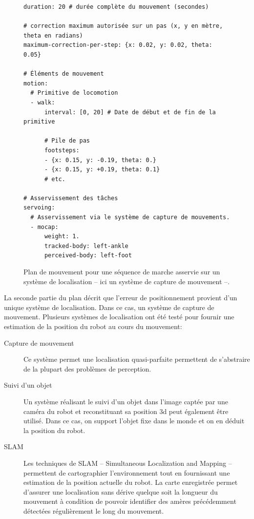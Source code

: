 \begin{figure}
  \begin{center}
\begin{verbatim}
duration: 20 # durée complète du mouvement (secondes)

# correction maximum autorisée sur un pas (x, y en mètre, theta en radians)
maximum-correction-per-step: {x: 0.02, y: 0.02, theta: 0.05}

# Éléments de mouvement
motion:
  # Primitive de locomotion
  - walk:
      interval: [0, 20] # Date de début et de fin de la primitive

      # Pile de pas
      footsteps:
      - {x: 0.15, y: -0.19, theta: 0.}
      - {x: 0.15, y: +0.19, theta: 0.1}
      # etc.

# Asservissement des tâches
servoing:
  # Asservissement via le système de capture de mouvements.
  - mocap:
      weight: 1.
      tracked-body: left-ankle
      perceived-body: left-foot
\end{verbatim}
  \end{center}
  \caption{Plan de mouvement pour une séquence de marche asservie sur
    un système de localisation -- ici un système de capture de
    mouvement --.}
\end{figure}

La seconde partie du plan décrit que l'erreur de positionnement
provient d'un unique système de localisation. Dans ce cas, un système
de capture de mouvement. Plusieurs systèmes de localisation ont été
testé pour fournir une estimation de la position du robot au cours du
mouvement:

\begin{description}
\item[Capture de mouvement] Ce système permet une localisation
  quasi-parfaite permettent de s'abstraire de la plupart des problèmes
  de perception.
\item[Suivi d'un objet] Un système réalisant le suivi d'un objet dans
  l'image captée par une caméra du robot et reconstituant sa position
  3d peut également être utilisé. Dans ce cas, on support l'objet fixe
  dans le monde et on en déduit la position du robot.
\item[SLAM] Les techniques de SLAM -- Simultaneous Localization and
  Mapping -- permettent de cartographier l'environnement tout en
  fournissant une estimation de la position actuelle du robot. La
  carte enregistrée permet d'assurer une localisation sans dérive
  quelque soit la longueur du mouvement à condition de pouvoir
  identifier des amères précédemment détectées régulièrement le long
  du mouvement.
\end{description}

